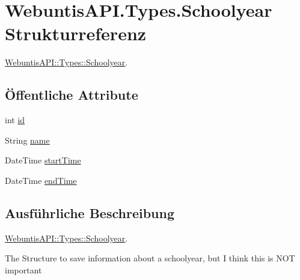 \hypertarget{struct_webuntis_a_p_i_1_1_types_1_1_schoolyear}{\section{Webuntis\-A\-P\-I.\-Types.\-Schoolyear Strukturreferenz}
\label{struct_webuntis_a_p_i_1_1_types_1_1_schoolyear}
}


\hyperlink{struct_webuntis_a_p_i_1_1_types_1_1_schoolyear}{Webuntis\-A\-P\-I\-::\-Types\-::\-Schoolyear}.  


\subsection*{Öffentliche Attribute}
\begin{DoxyCompactItemize}
\item 
int \hyperlink{struct_webuntis_a_p_i_1_1_types_1_1_schoolyear_a5919885c6ffc12918b27fb9f13fd2c79}{id}
\item 
String \hyperlink{struct_webuntis_a_p_i_1_1_types_1_1_schoolyear_a230844174db7f59e6536a2083ade0c41}{name}
\item 
Date\-Time \hyperlink{struct_webuntis_a_p_i_1_1_types_1_1_schoolyear_a137e91a773888c2c55dcbe153290e783}{start\-Time}
\item 
Date\-Time \hyperlink{struct_webuntis_a_p_i_1_1_types_1_1_schoolyear_ab90946531bc36b904e2a71b3ee44b03f}{end\-Time}
\end{DoxyCompactItemize}


\subsection{Ausführliche Beschreibung}
\hyperlink{struct_webuntis_a_p_i_1_1_types_1_1_schoolyear}{Webuntis\-A\-P\-I\-::\-Types\-::\-Schoolyear}. 

The Structure to save information about a schoolyear, but I think this is N\-O\-T important 

